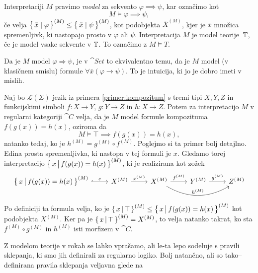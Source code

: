 \documentclass[../kategoricna_logika.tex]{subfiles}
\begin{document}
\begin{definicija}
    Interpretaciji $M$ pravimo \emph{model} za sekvento
    $\varphi \implies \psi$, kar označimo kot
  $$M \models \varphi \implies \psi,$$
  če velja
  $\left\lbrace\,\bar{x} \mid \varphi\,\right\rbrace^{(M)} \leq \left\lbrace\,\bar{x} \mid
    \psi\,\right\rbrace^{(M)}$, kot podobjekta $\bar{X}^{(M)}$, kjer je $\bar{x}$
  množica spremenljivk, ki nastopajo prosto v $\varphi$ ali $\psi$.
  Interpretacija $M$ je model teorije~$\mathbb{T}$, če je model vsake sekvente
  v $\mathbb{T}$.  To označimo z $M \models T$.
\end{definicija}
\begin{opomba}
  Da je $M$ model $\varphi \Rightarrow \psi$, je v $\cat{Set}$ to
  ekvivalentno temu, da je $M$ model (v klasičnem smislu) formule
  $\forall \bar{x} (\varphi \rightarrow \psi)$. To je intuicija, ki jo
  je dobro imeti v mislih.
\end{opomba}
\begin{primer}
  Naj bo $\mathcal{L}(\Sigma)$ jezik iz primera
  \ref{primer:kompozitum} s tremi tipi $X,Y,Z$ in funkcijskimi simboli
  $f : X \to Y$, $g : Y \to Z$ in $h : X \to Z$.  Potem za
  interpretacijo $M$ v regularni kategoriji $\cat{C}$ velja, da je $M$
  model formule kompozituma $f(g(x)) = h(x)$, oziroma da
  $$M \models \top \implies f(g(x)) = h(x),$$ 
  natanko tedaj, ko je $h^{(M)} = g^{(M)} \circ f^{(M)}$.  Poglejmo si
  ta primer bolj detajlno.  Edina prosta spremenljivka, ki nastopa v
  tej formuli je $x$. Gledamo torej interpretacijo
  $\left\lbrace\,x \,\middle|\, f(g(x)) = h(x)\,\right\rbrace^{(M)}$, ki je realizirana kot
  zožek
  \begin{equation*}
    \begin{tikzcd}[column sep=normal]
      \set{x \,\middle|\, f(g(x)) = h(x)}^{(M)} \ar[r, hook, "e"] &
      X^{(M)} \ar[r, "x^{(M)}"] & X^{(M)} \ar[r, "f^{(M)}"] \ar[rr,
      bend right, "h^{(M)}"] & Y^{(M)} \ar[r, "g^{(M)}"] & Z^{(M)}
    \end{tikzcd}
  \end{equation*}
  Po definiciji ta formula velja, ko je
  $\left\lbrace\,x \,\middle|\, \top\,\right\rbrace^{(M)} \leq \left\lbrace\,x \,\middle|\, f(g(x)) =
    h(x)\,\right\rbrace^{(M)}$ kot podobjekta $X^{(M)}$.  Ker pa je
  $\left\lbrace\,x \,\middle|\, \top\,\right\rbrace^{(M)} = X^{(M)}$, to velja natanko
  takrat, ko sta $f^{(M)} \circ g^{(M)}$ in $h^{(M)}$ isti morfizem v
  $\cat{C}$.
\end{primer}
Z modelom teorije v rokah se lahko vprašamo, ali le-ta lepo sodeluje s
pravili sklepanja, ki smo jih definirali za regularno logiko.  Bolj
natančno, ali so tako--definirana pravila sklepanja veljavna glede na
\end{document}
